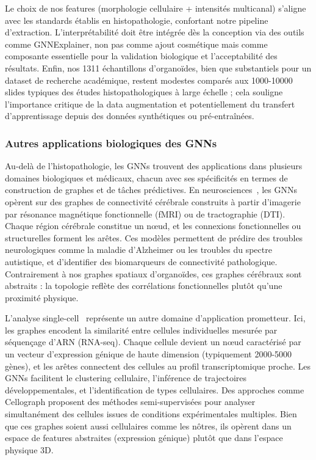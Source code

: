 Le choix de nos features (morphologie cellulaire + intensités multicanal) s'aligne avec les standards établis en histopathologie, confortant notre pipeline d'extraction. L'interprétabilité doit être intégrée dès la conception via des outils comme GNNExplainer, non pas comme ajout cosmétique mais comme composante essentielle pour la validation biologique et l'acceptabilité des résultats. Enfin, nos 1311 échantillons d'organoïdes, bien que substantiels pour un dataset de recherche académique, restent modestes comparés aux 1000-10000 slides typiques des études histopathologiques à large échelle ; cela souligne l'importance critique de la data augmentation et potentiellement du transfert d'apprentissage depuis des données synthétiques ou pré-entraînées.

\subsubsection{Autres applications biologiques des GNNs}

Au-delà de l'histopathologie, les GNNs trouvent des applications dans plusieurs domaines biologiques et médicaux, chacun avec ses spécificités en termes de construction de graphes et de tâches prédictives. En neurosciences~\cite{Luo2024,Bessadok2022}, les GNNs opèrent sur des graphes de connectivité cérébrale construits à partir d'imagerie par résonance magnétique fonctionnelle (fMRI) ou de tractographie (DTI). Chaque région cérébrale constitue un nœud, et les connexions fonctionnelles ou structurelles forment les arêtes. Ces modèles permettent de prédire des troubles neurologiques comme la maladie d'Alzheimer ou les troubles du spectre autistique, et d'identifier des biomarqueurs de connectivité pathologique. Contrairement à nos graphes spatiaux d'organoïdes, ces graphes cérébraux sont abstraits : la topologie reflète des corrélations fonctionnelles plutôt qu'une proximité physique.

L'analyse single-cell~\cite{Shahir2024} représente un autre domaine d'application prometteur. Ici, les graphes encodent la similarité entre cellules individuelles mesurée par séquençage d'ARN (RNA-seq). Chaque cellule devient un nœud caractérisé par un vecteur d'expression génique de haute dimension (typiquement 2000-5000 gènes), et les arêtes connectent des cellules au profil transcriptomique proche. Les GNNs facilitent le clustering cellulaire, l'inférence de trajectoires développementales, et l'identification de types cellulaires. Des approches comme Cellograph proposent des méthodes semi-supervisées pour analyser simultanément des cellules issues de conditions expérimentales multiples. Bien que ces graphes soient aussi cellulaires comme les nôtres, ils opèrent dans un espace de features abstraites (expression génique) plutôt que dans l'espace physique 3D.

